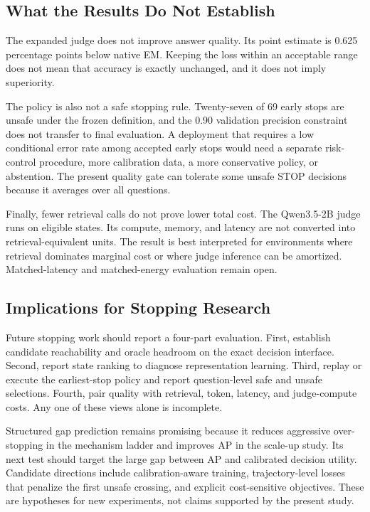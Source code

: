 \documentclass[11pt,a4paper]{article}
\begin{document}
\subsection{What the Results Do Not Establish}

The expanded judge does not improve answer quality. Its point estimate is 0.625 percentage points below native EM. Keeping the loss within an acceptable range does not mean that accuracy is exactly unchanged, and it does not imply superiority.

The policy is also not a safe stopping rule. Twenty-seven of 69 early stops are unsafe under the frozen definition, and the 0.90 validation precision constraint does not transfer to final evaluation. A deployment that requires a low conditional error rate among accepted early stops would need a separate risk-control procedure, more calibration data, a more conservative policy, or abstention. The present quality gate can tolerate some unsafe STOP decisions because it averages over all questions.

Finally, fewer retrieval calls do not prove lower total cost. The Qwen3.5-2B judge runs on eligible states. Its compute, memory, and latency are not converted into retrieval-equivalent units. The result is best interpreted for environments where retrieval dominates marginal cost or where judge inference can be amortized. Matched-latency and matched-energy evaluation remain open.

\subsection{Implications for Stopping Research}

Future stopping work should report a four-part evaluation. First, establish candidate reachability and oracle headroom on the exact decision interface. Second, report state ranking to diagnose representation learning. Third, replay or execute the earliest-stop policy and report question-level safe and unsafe selections. Fourth, pair quality with retrieval, token, latency, and judge-compute costs. Any one of these views alone is incomplete.

Structured gap prediction remains promising because it reduces aggressive over-stopping in the mechanism ladder and improves AP in the scale-up study. Its next test should target the large gap between AP and calibrated decision utility. Candidate directions include calibration-aware training, trajectory-level losses that penalize the first unsafe crossing, and explicit cost-sensitive objectives. These are hypotheses for new experiments, not claims supported by the present study.
\end{document}
